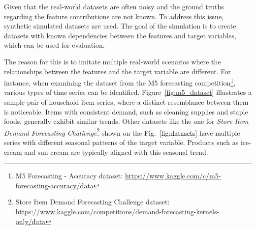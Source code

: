 Given that the real-world datasets are often noisy and the ground truths regarding the feature contributions are not known.
To address this issue, synthetic simulated datasets are used.
The goal of the simulation is to create datasets with known dependencies between the features and target variables, which can be used for evaluation.

The reason for this is to imitate multiple real-world scenarios where the relationships between the features and the target variable are different.
For instance, when examining the dataset from the M5 forecasting competition\footnote{M5 Forecasting - Accuracy dataset: \url{https://www.kaggle.com/c/m5-forecasting-accuracy/data}\label{m5ds}}, various types of time series can be identified.
Figure~\ref{fig:m5_dataset} illustrates a sample pair of household item series, where a distinct resemblance between them is noticeable.
Items with consistent demand, such as cleaning supplies and staple foods, generally exhibit similar trends.
Other datasets like the one for \emph{Store Item Demand Forecasting Challenge}\footnote{Store Item Demand Forecasting Challenge dataset: \url{https://www.kaggle.com/competitions/demand-forecasting-kernels-only/data}\label{kaggleds}}
shown on the Fig.~\ref{fig:datasets} have multiple series with different seasonal patterns of the target variable.
Products such as ice-cream and sun cream are typically aligned with this seasonal trend.


